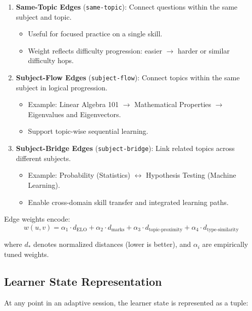\documentclass[sigconf,authordraft,twoside]{acmart}
\newcommand{\tech}[1]{\textcolor{brandblue}{\nolinkurl{#1}}}
\begin{document}
\begin{enumerate}
\item \textbf{Same-Topic Edges} (\tech{same-topic}): Connect questions within the same subject and topic.
   \begin{itemize}
   \item Useful for focused practice on a single skill.
   \item Weight reflects difficulty progression: easier $\to$ harder or similar difficulty hops.
   \end{itemize}

\item \textbf{Subject-Flow Edges} (\tech{subject-flow}): Connect topics within the same subject in logical progression.
   \begin{itemize}
   \item Example: Linear Algebra 101 $\to$ Mathematical Properties $\to$ Eigenvalues and Eigenvectors.
   \item Support topic-wise sequential learning.
   \end{itemize}

\item \textbf{Subject-Bridge Edges} (\tech{subject-bridge}): Link related topics across different subjects.
   \begin{itemize}
   \item Example: Probability (Statistics) $\leftrightarrow$ Hypothesis Testing (Machine Learning).
   \item Enable cross-domain skill transfer and integrated learning paths.
   \end{itemize}
\end{enumerate}

Edge weights encode:
\begin{equation}
w(u, v) = \alpha_1 \cdot d_{\text{ELO}} + \alpha_2 \cdot d_{\text{marks}} + \alpha_3 \cdot d_{\text{topic-proximity}} + \alpha_4 \cdot d_{\text{type-similarity}}
\end{equation}

where $d_{*}$ denotes normalized distances (lower is better), and $\alpha_i$ are empirically tuned weights.

\subsection{Learner State Representation}

At any point in an adaptive session, the learner state is represented as a tuple:
\end{document}
